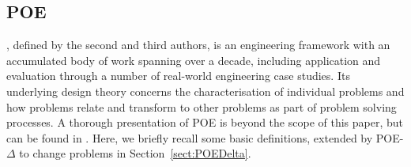 \documentclass[runningheads,a4paper]{llncs}
\begin{document}
  
\subsection{POE}\label{sect:POE}

\POE{}, defined by the second and third authors, is an engineering framework with an accumulated body of work spanning over a decade, including application and evaluation through a number of real-world engineering case studies. Its underlying design theory concerns the characterisation of individual problems and how problems relate and transform to other problems as part of problem solving processes. A thorough presentation of POE is beyond the scope of this paper, but can be found in \cite{hall2016a-design}. Here, we briefly recall some basic definitions, extended by POE-$\Delta$ to change problems in Section~\ref{sect:POEDelta}.
\end{document}
